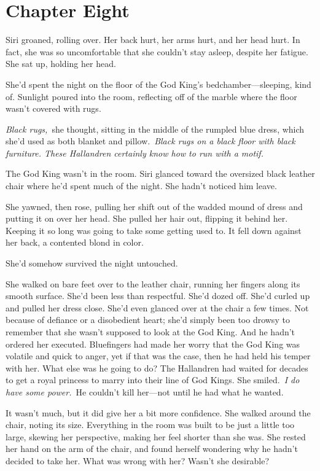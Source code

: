 \section{Chapter Eight}

Siri groaned, rolling over. Her back hurt, her arms hurt, and her head hurt. In fact, she was so uncomfortable that she couldn’t stay asleep, despite her fatigue. She sat up, holding her head.

She’d spent the night on the floor of the God King’s bedchamber—sleeping, kind of. Sunlight poured into the room, reflecting off of the marble where the floor wasn’t covered with rugs.

\textit{Black rugs,}~she thought, sitting in the middle of the rumpled blue dress, which she’d used as both blanket and pillow.~\textit{Black rugs on a black floor with black furniture. These Hallandren certainly know how to run with a motif.}

The God King wasn’t in the room. Siri glanced toward the oversized black leather chair where he’d spent much of the night. She hadn’t noticed him leave.

She yawned, then rose, pulling her shift out of the wadded mound of dress and putting it on over her head. She pulled her hair out, flipping it behind her. Keeping it so long was going to take some getting used to. It fell down against her back, a contented blond in color.

She’d somehow survived the night untouched.

She walked on bare feet over to the leather chair, running her fingers along its smooth surface. She’d been less than respectful. She’d dozed off. She’d curled up and pulled her dress close. She’d even glanced over at the chair a few times. Not because of defiance or a disobedient heart; she’d simply been too drowsy to remember that she wasn’t supposed to look at the God King. And he hadn’t ordered her executed. Bluefingers had made her worry that the God King was volatile and quick to anger, yet if that was the case, then he had held his temper with her. What else was he going to do? The Hallandren had waited for decades to get a royal princess to marry into their line of God Kings. She smiled.~\textit{I do have some power.}~He couldn’t kill her—not until he had what he wanted.

It wasn’t much, but it did give her a bit more confidence. She walked around the chair, noting its size. Everything in the room was built to be just a little too large, skewing her perspective, making her feel shorter than she was. She rested her hand on the arm of the chair, and found herself wondering why he hadn’t decided to take her. What was wrong with her? Wasn’t she desirable?


